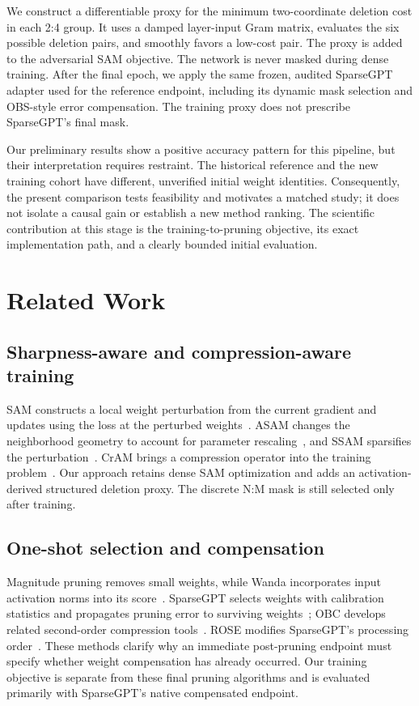 \documentclass[10pt,a4paper]{article}
\begin{document}
We construct a differentiable proxy for the minimum two-coordinate deletion cost in each 2:4 group. It uses a damped layer-input Gram matrix, evaluates the six possible deletion pairs, and smoothly favors a low-cost pair. The proxy is added to the adversarial SAM objective. The network is never masked during dense training. After the final epoch, we apply the same frozen, audited SparseGPT adapter used for the reference endpoint, including its dynamic mask selection and OBS-style error compensation. The training proxy does not prescribe SparseGPT's final mask.

Our preliminary results show a positive accuracy pattern for this pipeline, but their interpretation requires restraint. The historical reference and the new training cohort have different, unverified initial weight identities. Consequently, the present comparison tests feasibility and motivates a matched study; it does not isolate a causal gain or establish a new method ranking. The scientific contribution at this stage is the training-to-pruning objective, its exact implementation path, and a clearly bounded initial evaluation.

\section{Related Work}
\subsection{Sharpness-aware and compression-aware training}
SAM constructs a local weight perturbation from the current gradient and updates using the loss at the perturbed weights~\cite{sam}. ASAM changes the neighborhood geometry to account for parameter rescaling~\cite{asam}, and SSAM sparsifies the perturbation~\cite{ssam}. CrAM brings a compression operator into the training problem~\cite{cram}. Our approach retains dense SAM optimization and adds an activation-derived structured deletion proxy. The discrete N:M mask is still selected only after training.

\subsection{One-shot selection and compensation}
Magnitude pruning removes small weights, while Wanda incorporates input activation norms into its score~\cite{han_pruning,wanda}. SparseGPT selects weights with calibration statistics and propagates pruning error to surviving weights~\cite{sparsegpt}; OBC develops related second-order compression tools~\cite{obc}. ROSE modifies SparseGPT's processing order~\cite{rose}. These methods clarify why an immediate post-pruning endpoint must specify whether weight compensation has already occurred. Our training objective is separate from these final pruning algorithms and is evaluated primarily with SparseGPT's native compensated endpoint.
\end{document}
